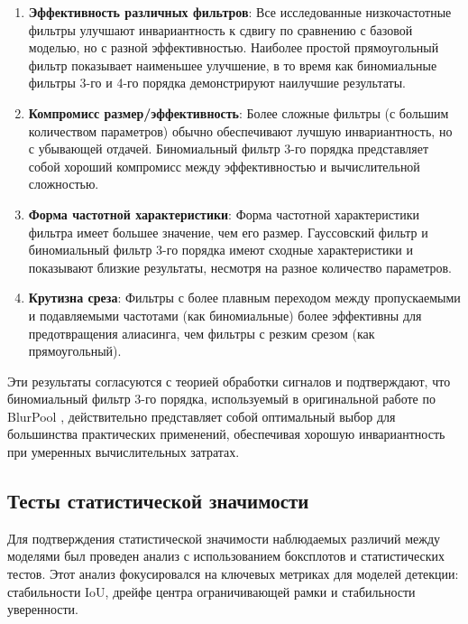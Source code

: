 \begin{enumerate}
    \item \textbf{Эффективность различных фильтров}: Все исследованные низкочастотные фильтры улучшают инвариантность к сдвигу по сравнению с базовой моделью, но с разной эффективностью. Наиболее простой прямоугольный фильтр показывает наименьшее улучшение, в то время как биномиальные фильтры 3-го и 4-го порядка демонстрируют наилучшие результаты.
    
    \item \textbf{Компромисс размер/эффективность}: Более сложные фильтры (с большим количеством параметров) обычно обеспечивают лучшую инвариантность, но с убывающей отдачей. Биномиальный фильтр 3-го порядка представляет собой хороший компромисс между эффективностью и вычислительной сложностью.
    
    \item \textbf{Форма частотной характеристики}: Форма частотной характеристики фильтра имеет большее значение, чем его размер. Гауссовский фильтр и биномиальный фильтр 3-го порядка имеют сходные характеристики и показывают близкие результаты, несмотря на разное количество параметров.
    
    \item \textbf{Крутизна среза}: Фильтры с более плавным переходом между пропускаемыми и подавляемыми частотами (как биномиальные) более эффективны для предотвращения алиасинга, чем фильтры с резким срезом (как прямоугольный).
\end{enumerate}

Эти результаты согласуются с теорией обработки сигналов и подтверждают, что биномиальный фильтр 3-го порядка, используемый в оригинальной работе по BlurPool \cite{Zhang2019}, действительно представляет собой оптимальный выбор для большинства практических применений, обеспечивая хорошую инвариантность при умеренных вычислительных затратах.

\subsection{Тесты статистической значимости}
\label{experiments:ablation:statistical_tests}

Для подтверждения статистической значимости наблюдаемых различий между моделями был проведен анализ с использованием боксплотов и статистических тестов. Этот анализ фокусировался на ключевых метриках для моделей детекции: стабильности IoU, дрейфе центра ограничивающей рамки и стабильности уверенности.

